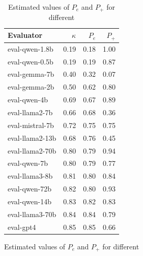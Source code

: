 \begin{figure}[!htbp]
\begin{minipage}{0.45\textwidth}
   \begin{table}[H]
    \centering
    \label{tab:p-vals}
    \begin{tabular}{lrrr}
      \toprule
      Evaluator & $\kappa$ & $P_e$ & $P_+$ \\
      \midrule
      eval-qwen-1.8b & 0.19 & 0.18 & 1.00 \\
      eval-qwen-0.5b & 0.19 & 0.19 & 0.87 \\
      eval-gemma-7b & 0.40 & 0.32 & 0.07 \\
      eval-gemma-2b & 0.50 & 0.62 & 0.80 \\
      eval-qwen-4b & 0.69 & 0.67 & 0.89 \\
      eval-llama2-7b & 0.66 & 0.68 & 0.36 \\
      eval-mistral-7b & 0.72 & 0.75 & 0.75 \\
      eval-llama2-13b & 0.68 & 0.76 & 0.45 \\
      eval-llama2-70b & 0.80 & 0.79 & 0.94 \\
      eval-qwen-7b & 0.80 & 0.79 & 0.77 \\
      eval-llama3-8b & 0.81 & 0.80 & 0.84 \\
      eval-qwen-72b & 0.82 & 0.80 & 0.93 \\
      eval-qwen-14b & 0.83 & 0.82 & 0.83 \\
      eval-llama3-70b & 0.84 & 0.84 & 0.79 \\
      eval-gpt4 & 0.85 & 0.85 & 0.66 \\
      \bottomrule
    \end{tabular}
    \caption{Estimated values of $P_e$ and $P_+$ for different \judgemodels}
    \label{tab:pvals}
    \end{table}
    

\end{minipage}
\end{figure}
